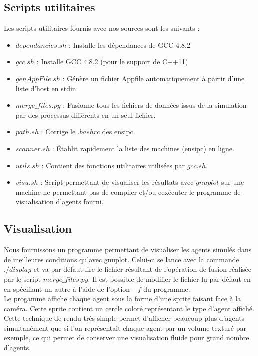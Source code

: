 \documentclass[12pt,a4paper,sans]{article}
\begin{document}
\subsection{Scripts utilitaires}
Les scripts utilitaires fournis avec nos sources sont les suivants :
\begin{itemize}
    \item $dependancies.sh$ : Installe les dépendances de GCC 4.8.2 
    \item $gcc.sh$          : Installe GCC 4.8.2 (pour le support de C++11)
    \item $genAppFile.sh$   : Génère un fichier Appfile automatiquement à partir d'une liste d'host en stdin.
    \item $merge\_files.py$ : Fusionne tous les fichiers de données issus de la simulation par des processus différents en un seul fichier.
    \item $path.sh$         : Corrige le $.bashrc$ des ensipc.
    \item $scanner.sh$      : Établit rapidement la liste des machines (ensipc) en ligne.
    \item $utils.sh$        : Contient des fonctions utilitaires utilisées par $gcc.sh$.
    \item $visu.sh$         : Script permettant de visualiser les résultats avec $gnuplot$ sur une machine ne permettant pas de compiler et/ou eexécuter le programme de visualisation d'agents fourni.
\end{itemize}

\subsection{Visualisation}
Nous fournissons un programme permettant de visualiser les agents simulés dans de meilleures conditions qu'avec gnuplot.
Celui-ci se lance avec la commande $./display$ et va par défaut lire le fichier résultant de l'opération de fusion réalisée par le script $merge\_files.py$. Il est possible de modifier le fichier lu par défaut en en spécifiant un autre à l'aide de l'option $-f$ du programme.\\

Le progamme affiche chaque agent sous la forme d'une sprite faisant face à la caméra. Cette sprite contient un cercle coloré représentant le type d'agent affiché. Cette technique de rendu très simple permet d'afficher beaucoup plus d'agents simultanément que si l'on représentait chaque agent par un volume texturé par exemple, ce qui permet de conserver une visualisation fluide pour grand nombre d'agents.\\
\end{document}
